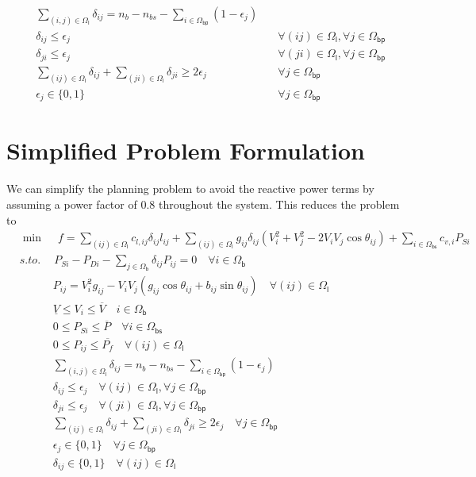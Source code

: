 \begin{equation}
\begin{aligned}
&\sum_{(i,j)\in\mathsf{\Omega_l}}\delta_{ij}=n_b-n_{bs}-\sum_{i\in\mathsf{\Omega_{bp}}}(1-\epsilon_j)&\\
&\delta_{ij}\leq\epsilon_j&\quad \forall (ij)\in\mathsf{\Omega_{l}},\forall j\in\mathsf{\Omega_{bp}}\\
&\delta_{ji}\leq\epsilon_j&\quad \forall (ji)\in\mathsf{\Omega_{l}},\forall j\in\mathsf{\Omega_{bp}}\\
&\sum_{(ij)\in\mathsf{\Omega_l}}\delta_{ij}+\sum_{(ji)\in\mathsf{\Omega_l}}\delta_{ji}\geq 2\epsilon_j&\quad \forall j\in\mathsf{\Omega_{bp}}\\
&\epsilon_{j}\in\{0,1\}&\quad \forall j\in\mathsf{\Omega_{bp}}
\end{aligned}
\label{eq:radiality}
\end{equation}
\newpage
\section{Simplified Problem Formulation}
We can simplify the planning problem to avoid the reactive power terms by assuming a power factor of $0.8$ throughout the system. This reduces the problem to
\begin{equation}
\begin{aligned}
&\min\quad\  f=\sum_{(ij)\in\mathsf{\Omega_l}}{c_{l,ij}\delta_{ij}l_{ij}}+\sum_{(ij)\in\mathsf{\Omega_l}}{g_{ij}\delta_{ij}(V_i^2+V_j^2-2V_iV_j\cos\theta_{ij})}+\sum_{i\in\mathsf{\Omega_{bs}}}{c_{v,i}P_{Si}}\label{eq:simple-1}\\
&s.to.\quad\ P_{Si}-P_{Di}-\sum_{j\in\mathsf{\Omega_{b}}}{\delta_{ij}P_{ij}}=0\quad\forall i\in\mathsf{\Omega_{b}}\\
&\quad\quad\quad P_{ij}=V_i^2g_{ij}-V_iV_j(g_{ij}\cos\theta_{ij}+b_{ij}\sin\theta_{ij})\quad \forall (ij)\in\mathsf{\Omega_l}\\
&\quad\quad\quad \underline{V}\leq V_i\leq\overline{V}\quad i\in\mathsf{\Omega_b}\\
&\quad\quad\quad 0\leq P_{Si}\leq \overline{P}\quad \forall i\in\mathsf{\Omega_{bs}}\\
&\quad\quad\quad 0\leq P_{ij}\leq \overline{P_f}\quad \forall (ij)\in\mathsf{\Omega_{l}}\\
&\quad\quad\quad\sum_{(i,j)\in\mathsf{\Omega_l}}\delta_{ij}=n_b-n_{bs}-\sum_{i\in\mathsf{\Omega_{bp}}}(1-\epsilon_j)\\
&\quad\quad\quad\delta_{ij}\leq\epsilon_j\quad \forall (ij)\in\mathsf{\Omega_{l}},\forall j\in\mathsf{\Omega_{bp}}\\
&\quad\quad\quad\delta_{ji}\leq\epsilon_j\quad \forall (ji)\in\mathsf{\Omega_{l}},\forall j\in\mathsf{\Omega_{bp}}\\
&\quad\quad\quad\sum_{(ij)\in\mathsf{\Omega_l}}\delta_{ij}+\sum_{(ji)\in\mathsf{\Omega_l}}\delta_{ji}\geq 2\epsilon_j\quad \forall j\in\mathsf{\Omega_{bp}}\\
&\quad\quad\quad\epsilon_{j}\in\{0,1\}\quad \forall j\in\mathsf{\Omega_{bp}}\\
&\quad\quad\quad\delta_{ij}\in\{0,1\}\quad\forall (ij)\in\mathsf{\Omega_{l}}
\end{aligned}
\end{equation}